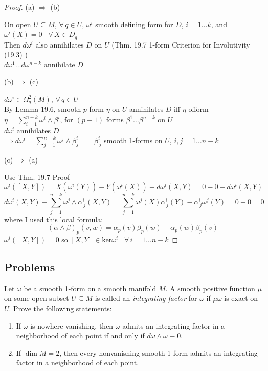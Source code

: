 \begin{proof}
(a) $\Longrightarrow$ (b) 

On open $U\subseteq M$, $\forall \, q \in U$, $\omega^i$ smooth defining form for $D$, $i=1\dots k$, and $\omega^i(X) = 0$ \, $\forall \, X \in D_q$  \\
\phantom{ On open } Then $d\omega^i$ also annihilates $D$ on $U$ (Thm. 19.7 1-form Criterion for Involutivity (19.3) ) \\
$d\omega^1 \dots d\omega^{n-k}$ annihilate $D$

(b) $\Longrightarrow $ (c)

$d\omega^i \in \Omega^2_q(M)$, $\forall \, q \in U$ \\
By Lemma 19.6, smooth $p$-form $\eta$ on $U$ annihilates $D$ iff $\eta$ ofform $\eta = \sum_{i=1}^{n-k} \omega^i\wedge \beta^i$, for $(p-1)$ forms $\beta^1 \dots \beta^{n-k}$ on $U$ \\
$d\omega^i$ annihilates $D$ \\
\phantom{\quad \, } $\Longrightarrow d\omega^i = \sum_{j=1}^{n-k} \omega^j \wedge \beta_j^i \quad \quad \, \beta^i_{ \, j} $ smooth 1-forms on $U$, $i,j=1\dots n-k$

(c) $\Longrightarrow $ (a) 

Use Thm. 19.7 Proof
\[
\omega^i([X,Y]) = X(\omega^i(Y)) - Y(\omega^i(X)) - d\omega^i(X,Y)  = 0 -0 - d\omega^i(X,Y)
\]
\[
d\omega^i(X,Y) - \sum_{j=1}^{n-k} \omega^j \wedge \alpha^i_{ \, j}(X,Y) = \sum_{j=1}^{n-k} \omega^j(X) \alpha^i_{ \, j }(Y) - \alpha^i_{ \, j}\omega^j(Y) = 0 - 0 = 0 
\]
where I used this local formula:
\[
(\alpha \wedge \beta)_p(v,w) = \alpha_p(v) \beta_p(w) - \alpha_p(w) \beta_p(v)
\]
$\omega^i([X,Y]) = 0$ so $[X,Y] \in \text{ker}\omega^i$ \quad \, $\forall \, i = 1 \dots n-k$

\end{proof}



\subsection*{Problems}

\begin{exercise}
Let $\omega$ be a smooth 1-form on a smooth manifold $M$. A smooth positive function $\mu$ on some open subset $U\subseteq M$ is called an \emph{integrating factor} for $\omega$ if $\mu\omega$ is exact on $U$. Prove the following statements:
\begin{enumerate}
\item[(a)] If $\omega$ is nowhere-vanishing, then $\omega$ admits an integrating factor in a neighborhood of each point if and only if $d\omega\wedge\omega\equiv 0$.
\item[(b)] If $\dim M=2$, then every nonvanishing smooth 1-form admits an integrating factor in a neighborhood of each point.
\end{enumerate}
\end{exercise}
